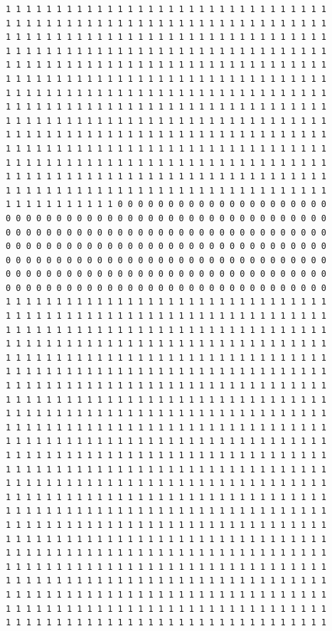 \documentclass [10 pt, a4 paper]{report}
\begin{document}
\begin{lstlisting}[caption=Output of the simulation once it is finished, label={lst:code1}, frame=single]
1 1 1 1 1 1 1 1 1 1 1 1 1 1 1 1 1 1 1 1 1 1 1 1 1 1 1 1 1 1 1 1
1 1 1 1 1 1 1 1 1 1 1 1 1 1 1 1 1 1 1 1 1 1 1 1 1 1 1 1 1 1 1 1
1 1 1 1 1 1 1 1 1 1 1 1 1 1 1 1 1 1 1 1 1 1 1 1 1 1 1 1 1 1 1 1
1 1 1 1 1 1 1 1 1 1 1 1 1 1 1 1 1 1 1 1 1 1 1 1 1 1 1 1 1 1 1 1
1 1 1 1 1 1 1 1 1 1 1 1 1 1 1 1 1 1 1 1 1 1 1 1 1 1 1 1 1 1 1 1
1 1 1 1 1 1 1 1 1 1 1 1 1 1 1 1 1 1 1 1 1 1 1 1 1 1 1 1 1 1 1 1
1 1 1 1 1 1 1 1 1 1 1 1 1 1 1 1 1 1 1 1 1 1 1 1 1 1 1 1 1 1 1 1
1 1 1 1 1 1 1 1 1 1 1 1 1 1 1 1 1 1 1 1 1 1 1 1 1 1 1 1 1 1 1 1
1 1 1 1 1 1 1 1 1 1 1 1 1 1 1 1 1 1 1 1 1 1 1 1 1 1 1 1 1 1 1 1
1 1 1 1 1 1 1 1 1 1 1 1 1 1 1 1 1 1 1 1 1 1 1 1 1 1 1 1 1 1 1 1
1 1 1 1 1 1 1 1 1 1 1 1 1 1 1 1 1 1 1 1 1 1 1 1 1 1 1 1 1 1 1 1
1 1 1 1 1 1 1 1 1 1 1 1 1 1 1 1 1 1 1 1 1 1 1 1 1 1 1 1 1 1 1 1
1 1 1 1 1 1 1 1 1 1 1 1 1 1 1 1 1 1 1 1 1 1 1 1 1 1 1 1 1 1 1 1
1 1 1 1 1 1 1 1 1 1 1 1 1 1 1 1 1 1 1 1 1 1 1 1 1 1 1 1 1 1 1 1
1 1 1 1 1 1 1 1 1 1 1 0 0 0 0 0 0 0 0 0 0 0 0 0 0 0 0 0 0 0 0 0
0 0 0 0 0 0 0 0 0 0 0 0 0 0 0 0 0 0 0 0 0 0 0 0 0 0 0 0 0 0 0 0
0 0 0 0 0 0 0 0 0 0 0 0 0 0 0 0 0 0 0 0 0 0 0 0 0 0 0 0 0 0 0 0
0 0 0 0 0 0 0 0 0 0 0 0 0 0 0 0 0 0 0 0 0 0 0 0 0 0 0 0 0 0 0 0
0 0 0 0 0 0 0 0 0 0 0 0 0 0 0 0 0 0 0 0 0 0 0 0 0 0 0 0 0 0 0 0
0 0 0 0 0 0 0 0 0 0 0 0 0 0 0 0 0 0 0 0 0 0 0 0 0 0 0 0 0 0 0 0
0 0 0 0 0 0 0 0 0 0 0 0 0 0 0 0 0 0 0 0 0 0 0 0 0 0 0 0 0 0 0 0
1 1 1 1 1 1 1 1 1 1 1 1 1 1 1 1 1 1 1 1 1 1 1 1 1 1 1 1 1 1 1 1
1 1 1 1 1 1 1 1 1 1 1 1 1 1 1 1 1 1 1 1 1 1 1 1 1 1 1 1 1 1 1 1
1 1 1 1 1 1 1 1 1 1 1 1 1 1 1 1 1 1 1 1 1 1 1 1 1 1 1 1 1 1 1 1
1 1 1 1 1 1 1 1 1 1 1 1 1 1 1 1 1 1 1 1 1 1 1 1 1 1 1 1 1 1 1 1
1 1 1 1 1 1 1 1 1 1 1 1 1 1 1 1 1 1 1 1 1 1 1 1 1 1 1 1 1 1 1 1
1 1 1 1 1 1 1 1 1 1 1 1 1 1 1 1 1 1 1 1 1 1 1 1 1 1 1 1 1 1 1 1
1 1 1 1 1 1 1 1 1 1 1 1 1 1 1 1 1 1 1 1 1 1 1 1 1 1 1 1 1 1 1 1
1 1 1 1 1 1 1 1 1 1 1 1 1 1 1 1 1 1 1 1 1 1 1 1 1 1 1 1 1 1 1 1
1 1 1 1 1 1 1 1 1 1 1 1 1 1 1 1 1 1 1 1 1 1 1 1 1 1 1 1 1 1 1 1
1 1 1 1 1 1 1 1 1 1 1 1 1 1 1 1 1 1 1 1 1 1 1 1 1 1 1 1 1 1 1 1
1 1 1 1 1 1 1 1 1 1 1 1 1 1 1 1 1 1 1 1 1 1 1 1 1 1 1 1 1 1 1 1
1 1 1 1 1 1 1 1 1 1 1 1 1 1 1 1 1 1 1 1 1 1 1 1 1 1 1 1 1 1 1 1
1 1 1 1 1 1 1 1 1 1 1 1 1 1 1 1 1 1 1 1 1 1 1 1 1 1 1 1 1 1 1 1
1 1 1 1 1 1 1 1 1 1 1 1 1 1 1 1 1 1 1 1 1 1 1 1 1 1 1 1 1 1 1 1
1 1 1 1 1 1 1 1 1 1 1 1 1 1 1 1 1 1 1 1 1 1 1 1 1 1 1 1 1 1 1 1
1 1 1 1 1 1 1 1 1 1 1 1 1 1 1 1 1 1 1 1 1 1 1 1 1 1 1 1 1 1 1 1
1 1 1 1 1 1 1 1 1 1 1 1 1 1 1 1 1 1 1 1 1 1 1 1 1 1 1 1 1 1 1 1
1 1 1 1 1 1 1 1 1 1 1 1 1 1 1 1 1 1 1 1 1 1 1 1 1 1 1 1 1 1 1 1
1 1 1 1 1 1 1 1 1 1 1 1 1 1 1 1 1 1 1 1 1 1 1 1 1 1 1 1 1 1 1 1
1 1 1 1 1 1 1 1 1 1 1 1 1 1 1 1 1 1 1 1 1 1 1 1 1 1 1 1 1 1 1 1
1 1 1 1 1 1 1 1 1 1 1 1 1 1 1 1 1 1 1 1 1 1 1 1 1 1 1 1 1 1 1 1
1 1 1 1 1 1 1 1 1 1 1 1 1 1 1 1 1 1 1 1 1 1 1 1 1 1 1 1 1 1 1 1
1 1 1 1 1 1 1 1 1 1 1 1 1 1 1 1 1 1 1 1 1 1 1 1 1 1 1 1 1 1 1 1
1 1 1 1 1 1 1 1 1 1 1 1 1 1 1 1 1 1 1 1 1 1 1 1 1 1 1 1 1 1 1 1




\end{lstlisting}
\end{document}
